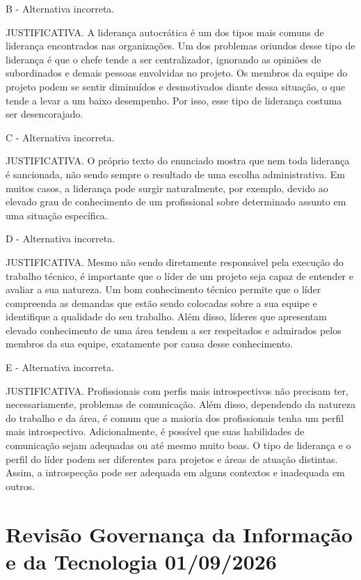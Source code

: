 \documentclass[
]{book}
\begin{document}
B - Alternativa incorreta.

JUSTIFICATIVA. A liderança autocrática é um dos tipos mais comuns de liderança encontrados nas organizações. Um dos problemas oriundos desse tipo de liderança é que o chefe tende a ser centralizador, ignorando as opiniões de subordinados e demais pessoas envolvidas no projeto. Os membros da equipe do projeto podem se sentir diminuídos e desmotivados diante dessa situação, o que tende a levar a um baixo desempenho. Por isso, esse tipo de liderança costuma ser desencorajado.~~

C - Alternativa incorreta.

JUSTIFICATIVA. O próprio texto do enunciado mostra que nem toda liderança é sancionada, não sendo sempre o resultado de uma escolha administrativa. Em muitos casos, a liderança pode surgir naturalmente, por exemplo, devido ao elevado grau de conhecimento de um profissional sobre determinado assunto em uma situação específica.

D - Alternativa incorreta.

JUSTIFICATIVA. Mesmo não sendo diretamente responsável pela execução do trabalho técnico, é importante que o líder de um projeto seja capaz de entender e avaliar a sua natureza. Um bom conhecimento técnico permite que o líder compreenda as demandas que estão sendo colocadas sobre a sua equipe e identifique a qualidade do seu trabalho. Além disso, líderes que apresentam elevado conhecimento de uma área tendem a ser respeitados e admirados pelos membros da sua equipe, exatamente por causa desse conhecimento.

E - Alternativa incorreta.

JUSTIFICATIVA. Profissionais com perfis mais introspectivos não precisam ter, necessariamente, problemas de comunicação. Além disso, dependendo da natureza do trabalho e da área, é comum que a maioria dos profissionais tenha um perfil mais introspectivo. Adicionalmente, é possível que suas habilidades de comunicação sejam adequadas ou até mesmo muito boas. O tipo de liderança e o perfil do líder podem ser diferentes para projetos e áreas de atuação distintas. Assim, a introspecção pode ser adequada em alguns contextos e inadequada em outros.

\chapter{Revisão Governança da Informação e da Tecnologia 01/09/2026}\label{revisuxe3o-governanuxe7a-da-informauxe7uxe3o-e-da-tecnologia-01092026}
\end{document}
